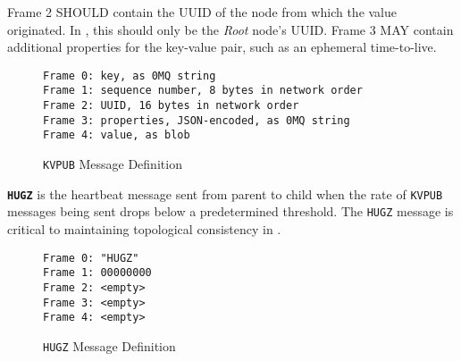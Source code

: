 Frame 2 SHOULD contain the UUID of the node from which the value originated. In \dcamp, this should only be the
\textit{Root} node's UUID. Frame 3 MAY contain additional properties for the key-value pair, such as an ephemeral
time-to-live.

\begin{figure}[H]
\vspace{+10pt}
\begin{verbatim}
Frame 0: key, as 0MQ string
Frame 1: sequence number, 8 bytes in network order
Frame 2: UUID, 16 bytes in network order
Frame 3: properties, JSON-encoded, as 0MQ string
Frame 4: value, as blob
\end{verbatim}
\vspace{-20pt}
\caption{\texttt{KVPUB} Message Definition}
\label{fig:message_kvpub}
\end{figure}

\textbf{\texttt{HUGZ}} is the heartbeat message sent from parent to child when the rate of \texttt{KVPUB} messages being
sent drops below a predetermined threshold. The \texttt{HUGZ} message is critical to maintaining topological consistency
in \dcamp.

\begin{figure}[H]
\vspace{+10pt}
\begin{verbatim}
Frame 0: "HUGZ"
Frame 1: 00000000
Frame 2: <empty>
Frame 3: <empty>
Frame 4: <empty>
\end{verbatim}
\vspace{-20pt}
\caption{\texttt{HUGZ} Message Definition}
\label{fig:message_hugz}
\end{figure}
